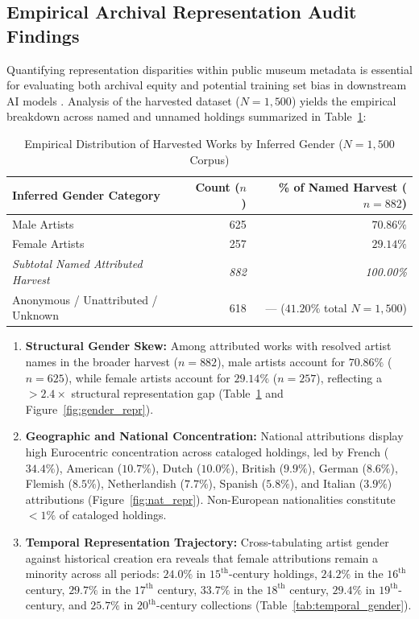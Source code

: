 \documentclass[pdflatex,sn-mathphys-num]{sn-jnl}%
\theoremstyle{thmstyleone}%
\theoremstyle{thmstyletwo}%
\theoremstyle{thmstylethree}%
\begin{document}
\subsection{Empirical Archival Representation Audit Findings}
Quantifying representation disparities within public museum metadata is essential for evaluating both archival equity and potential training set bias in downstream AI models \cite{topaz2019diversity, meier2021gender, noorthuis2020bias}. Analysis of the harvested dataset ($N=1,500$) yields the empirical breakdown across named and unnamed holdings summarized in Table~\ref{tab:gender_representation}:

\begin{table}[h]
\caption{Empirical Distribution of Harvested Works by Inferred Gender ($N=1,500$ Corpus)}
\label{tab:gender_representation}
\centering
\small
\begin{tabular}{lrr}
\toprule
\textbf{Inferred Gender Category} & \textbf{Count ($n$)} & \textbf{\% of Named Harvest ($n=882$)} \\
\midrule
Male Artists & 625 & $70.86\%$ \\
Female Artists & 257 & $29.14\%$ \\
\midrule
\textit{Subtotal Named Attributed Harvest} & \textit{882} & \textit{100.00\%} \\
Anonymous / Unattributed / Unknown & 618 & --- ($41.20\%$ total $N=1,500$) \\
\bottomrule
\end{tabular}
\end{table}

\begin{enumerate}
    \item \textbf{Structural Gender Skew:} Among attributed works with resolved artist names in the broader harvest ($n=882$), male artists account for $70.86\%$ ($n=625$), while female artists account for $29.14\%$ ($n=257$), reflecting a $>2.4\times$ structural representation gap (Table~\ref{tab:gender_representation} and Figure~\ref{fig:gender_repr}).
    \item \textbf{Geographic and National Concentration:} National attributions display high Eurocentric concentration across cataloged holdings, led by French ($34.4\%$), American ($10.7\%$), Dutch ($10.0\%$), British ($9.9\%$), German ($8.6\%$), Flemish ($8.5\%$), Netherlandish ($7.7\%$), Spanish ($5.8\%$), and Italian ($3.9\%$) attributions (Figure~\ref{fig:nat_repr}). Non-European nationalities constitute $<1\%$ of cataloged holdings.
    \item \textbf{Temporal Representation Trajectory:} Cross-tabulating artist gender against historical creation era reveals that female attributions remain a minority across all periods: $24.0\%$ in $15^{\text{th}}$-century holdings, $24.2\%$ in the $16^{\text{th}}$ century, $29.7\%$ in the $17^{\text{th}}$ century, $33.7\%$ in the $18^{\text{th}}$ century, $29.4\%$ in $19^{\text{th}}$-century, and $25.7\%$ in $20^{\text{th}}$-century collections (Table~\ref{tab:temporal_gender}).
\end{enumerate}
\end{document}
